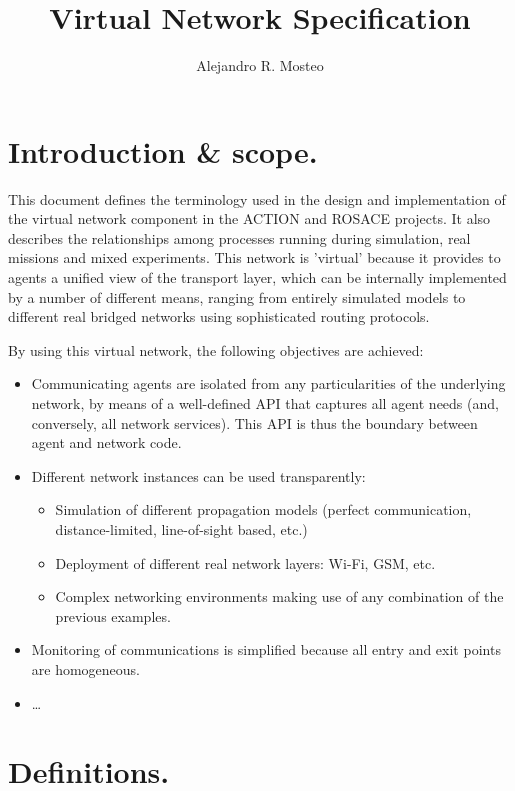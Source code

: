 \documentclass[a4paper,11pt]{article}
\newcommand{\myauthor}{Alejandro R. Mosteo}
\newcommand{\mytitle}{Virtual Network Specification}
\begin{document}
\author{\myauthor}
\title{\mytitle}
\maketitle

\tableofcontents

\section{Introduction \& scope.}

This document defines the terminology used in the design and implementation of the virtual network component in the ACTION and ROSACE projects. It also describes the relationships among processes running during simulation, real missions and mixed experiments. This network is 'virtual' because it provides to agents a unified view of the transport layer, which can be internally implemented by a number of different means, ranging from entirely simulated models to different real bridged networks using sophisticated routing protocols. 

By using this virtual network, the following objectives are achieved:

\begin{itemize}
    \item Communicating agents are isolated from any particularities of the underlying network, by means of a well-defined API that captures all agent needs (and, conversely, all network services). This API is thus the boundary between agent and network code.
    \item Different network instances can be used transparently:
        \begin{itemize}
            \item Simulation of different propagation models (perfect communication, distance-limited, line-of-sight based, etc.)
            \item Deployment of different real network layers: Wi-Fi, GSM, etc.
            \item Complex networking environments making use of any combination of the previous examples.
        \end{itemize}
    \item Monitoring of communications is simplified because all entry and exit points are homogeneous.
    \item \dots
\end{itemize}


\section{Definitions.}
\end{document}
